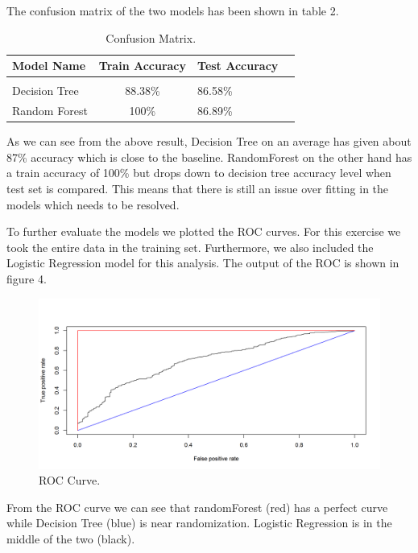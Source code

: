 \documentclass[twoside,11pt]{article}
\begin{document}
\vspace{5mm} The confusion matrix of the two models has been shown in table 2.
\begin{table}[htbp]
  \centering 
  \begin{tabular}{lclc} 
    Model Name & Train Accuracy & Test Accuracy \\ 
    \hline \\[-11pt]
    Decision Tree & 88.38\% & 86.58\% \\ 
    Random Forest & 100\% & 86.89\% \\ \hline 
  \end{tabular}
  \label{tab:conf_matrix} 
    \caption{Confusion Matrix.} 
\end{table}

As we can see from the above result, Decision Tree on an average has given about 87\% accuracy which is close to the baseline. RandomForest on the other hand has a train accuracy of 100\% but drops down to decision tree accuracy level when test set is compared. This means that there is still an issue over fitting in the models which needs to be resolved.

\vspace{5mm} To further evaluate the models we plotted the ROC curves. For this exercise we took the entire data in the training set. Furthermore, we also included the Logistic Regression model for this analysis. The output of the ROC is shown in figure 4.

\begin{figure}[htbp]
  \centering 
  \includegraphics[width=5.5in]{roc_curve.png} 
  \caption{ROC Curve.}
  \label{fig:roc_curve} 
\end{figure} 

From the ROC curve we can see that randomForest (red) has a perfect curve while Decision Tree (blue) is near randomization. Logistic Regression is in the middle of the two (black).
\end{document}
